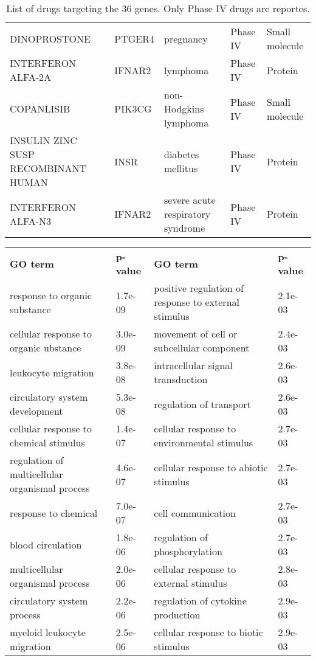 \documentclass[fleqn,10pt]{SelfArx} %
\begin{document}
\begin{table}[ht]
\begin{tabularx}{\textwidth}{lXlll}
		DINOPROSTONE & PTGER4 & pregnancy & Phase IV & Small molecule \\ 
		INTERFERON ALFA-2A & IFNAR2 & lymphoma & Phase IV & Protein \\ 
		COPANLISIB & PIK3CG & non-Hodgkins lymphoma & Phase IV & Small molecule \\ 
		INSULIN ZINC SUSP RECOMBINANT HUMAN & INSR & diabetes mellitus & Phase IV & Protein \\ 
		INTERFERON ALFA-N3 & IFNAR2 & severe acute respiratory syndrome & Phase IV & Protein \\ 
	\end{tabularx}
	\smallskip
	\caption{List of drugs targeting the 36 genes. Only Phase IV drugs are reportes.}
	\label{tab:drugs}
\end{table}


\begin{table}[ht]
	\centering
	\scriptsize
	\begin{tabularx}{\textwidth}{XlXl}
		\rowcolor{NavyBlue!80}
		\textbf{\color{white} GO term} & \textbf{\color{white} p-value} & \textbf{\color{white} GO term} & \textbf{\color{white} p-value} \\
		response to organic substance & 1.7e-09 & positive regulation of response to external stimulus & 2.1e-03 \\ 
		cellular response to organic ubstance & 3.0e-09 & movement of cell or subcellular component & 2.4e-03 \\ 
		leukocyte migration & 3.8e-08 & intracellular signal transduction & 2.6e-03 \\ 
		circulatory system development & 5.3e-08 & regulation of transport & 2.6e-03 \\ 
		cellular response to chemical stimulus & 1.4e-07 & cellular response to environmental stimulus & 2.7e-03 \\ 
		regulation of multicellular organismal process & 4.6e-07 & cellular response to abiotic stimulus & 2.7e-03 \\ 
		response to chemical & 7.0e-07 & cell communication & 2.7e-03 \\ 
		blood circulation & 1.8e-06 & regulation of phosphorylation & 2.7e-03 \\ 
		multicellular organismal process & 2.0e-06 & cellular response to external stimulus & 2.8e-03 \\ 
		circulatory system process & 2.2e-06 & regulation of cytokine production & 2.9e-03 \\ 
		myeloid leukocyte migration & 2.5e-06 & cellular response to biotic stimulus & 2.9e-03 \\ 

\end{tabularx}
\end{table}
\end{document}
